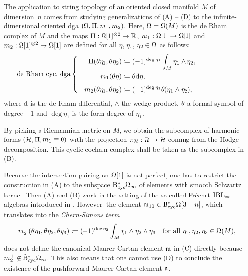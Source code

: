 \documentclass[\MainFolder/Text.tex]{subfiles}
\begin{document}
The application to string topology of an oriented closed manifold $M$ of dimension~$n$ comes from studying generalizations of (A) -- (D) to the infinite-dimensional oriented dga $(\Omega,\allowbreak \Pi,\allowbreak m_1,\allowbreak m_2)$. Here, $\Omega = \Omega(M)$ is the de Rham complex of $M$ and the maps $\Pi: \Omega[1]^{\otimes 2} \rightarrow \mathbb{R}$, $m_1: \Omega[1]\rightarrow \Omega[1]$ and $m_2: \Omega[1]^{\otimes 2} \rightarrow \Omega[1]$ are defined for all $\eta$, $\eta_1$, $\eta_2 \in \Omega$ as follows:
\begin{equation} \label{Eq:DeRhamDGA}
 \qquad \mathllap{\text{de Rham cyc.~dga}}\left\{ \begin{aligned}
 \Pair(\SuspU\eta_1,\SuspU\eta_2) &\coloneqq (-1)^{\deg \eta_1} \int_M \eta_1\wedge \eta_2, \\ 
 m_1(\SuspU\eta) &\coloneqq \SuspU \Dd \eta,\\[\jot] 
 \quad m_2(\SuspU\eta_1,\SuspU\eta_2) &\coloneqq (-1)^{\deg \eta_1} \SuspU(\eta_1\wedge\eta_2), \end{aligned}\right.
\end{equation}
where $\mathrm{d}$ is the de Rham differential, $\wedge$ the wedge product, $\theta$ a formal symbol of degree $-1$ and $\deg \eta_1$ is the form-degree of $\eta_1$.

By picking a Riemannian metric on $M$, we obtain the subcomplex of harmonic forms $(\mathcal{H}, \Pi, m_1 \equiv 0)$ with the projection $\pi_{\mathcal{H}}: \Omega \rightarrow \mathcal{H}$ coming from the Hodge decomposition.
This cyclic cochain complex shall be taken as the subcomplex in (B).

Because the intersection pairing on $\Omega[1]$ is not perfect, one has to restrict the construction in (A) to the subspace $\mathrm{B}_{\mathrm{cyc}}^* \Omega_\infty$ of elements with smooth Schwartz kernel.
Then (A) and (B) work in the setting of the so called Fr\'echet $\mathrm{IBL}_\infty$-algebras introduced in \cite[Section 13]{Cieliebak2015}.
However, the element $\mathfrak{m}_{10} \in \mathrm{B}_{\mathrm{cyc}}^* \Omega[3-n]$, which translates into the \emph{Chern-Simons term}
\begin{equation*} \label{Eq:ChernSimons}
 m_2^+(\theta\eta_1,\theta\eta_2,\theta\eta_3) \coloneqq (-1)^{\deg \eta_2}  \int_M \eta_1\wedge \eta_2\wedge\eta_3\quad\text{for all }\eta_1, \eta_2, \eta_3 \in \Omega(M),
\end{equation*}
does not define the canonical Maurer-Cartan element $\mathfrak{m}$ in (C) directly because $m_2^+ \not\in \hat{\mathrm{B}}_{\mathrm{cyc}}^* \Omega_\infty$.
This also means that one cannot use (D) to conclude the existence of the pushforward Maurer-Cartan element $\mathfrak{n}$.
\end{document}
